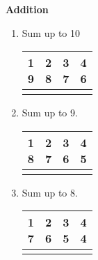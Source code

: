 \centerline{\textbf{ \LARGE  Addition }}

\begin{enumerate}

    \item Sum up to 10

    \begin{myTableStyle} \begin{tabular}{ |l|l|l|l| } \hline
        \makecell[l]{1 \\9} & \makecell[l]{2 \\8} & \makecell[l]{3 \\7} & \makecell[l]{4 \\6} \\\hline
        &&& \\\hline
    \end{tabular} \end{myTableStyle} \vspace{0.08in}

    \item Sum up to 9.

    \begin{myTableStyle} \begin{tabular}{ |l|l|l|l| } \hline
        \makecell[l]{1 \\8} & \makecell[l]{2 \\7} & \makecell[l]{3 \\6} & \makecell[l]{4 \\5} \\\hline
        &&& \\\hline
    \end{tabular} \end{myTableStyle} \vspace{0.08in}

    \item Sum up to 8.

    \begin{myTableStyle} \begin{tabular}{ |l|l|l|l| } \hline
        \makecell[l]{1 \\7} & \makecell[l]{2 \\6} & \makecell[l]{3 \\5} & \makecell[l]{4 \\4} \\\hline
        &&& \\\hline
    \end{tabular} \end{myTableStyle} \vspace{0.08in}


\end{enumerate}
